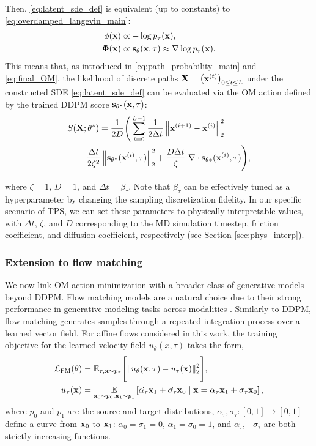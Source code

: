 Then, \eqref{eq:latent_sde_def} is equivalent (up to constants) to \eqref{eq:overdamped_langevin_main}:
\begin{align}
    \phi(\mathbf{x}) &\propto - \log p_\tau(\mathbf{x}), \\
    \mathbf{\Phi}(\mathbf{x}) &\propto \mathbf{s}_\theta(\mathbf{x}, \tau) \approx \nabla \log p_\tau(\mathbf{x}).
\end{align}
This means that, as introduced in \eqref{eq:path_probability_main} and \eqref{eq:final_OM}, the likelihood of discrete paths $\mathbf{X} = \left(\mathbf{x}^{(t)} \right)_{0 \leq t \leq L}$ under the constructed SDE \eqref{eq:latent_sde_def} can be evaluated via the OM action defined by the trained DDPM score $\mathbf{s}_{\theta^*}(\mathbf{x}, \tau)$:
\begin{align}
\begin{split}
    &S(\mathbf{X}; \theta^*) = \frac{1}{2D}\Bigg(\sum_{i=0}^{L-1}  \frac{1}{ 2\Delta t}\left\|\mathbf{x}^{(i+1)} - \mathbf{x}^{(i)} \right\|^2_2 \\
    &\quad 
    + \frac{\Delta t}{2\zeta^2} \left\|\mathbf{s}_{\theta^*}(\mathbf{x}^{(i)}, \tau)\right\|_2^2 + \frac{D \Delta t}{\zeta} \ \nabla \cdot \mathbf{s}_{\theta*}(\mathbf{x}^{(i)}, \tau)\Bigg),
\end{split}
\label{eq:generative_om_action}
\end{align}

where $\zeta = 1$, $D=1$, and $\Delta t = \beta_\tau$. Note that $\beta_\tau$ can be effectively tuned as a hyperparameter by changing the sampling discretization fidelity. In our specific scenario of TPS, we can set these parameters to physically interpretable values, with $\Delta t$, $\zeta$, and $D$ corresponding to the MD simulation timestep, friction coefficient, and diffusion coefficient, respectively (see Section \ref{sec:phys_interp}).

\subsubsection{Extension to flow matching}
We now link OM action-minimization with a broader class of generative models beyond DDPM. Flow matching models \cite{lipman2022flow} are a natural choice due to their strong performance in generative modeling tasks across modalities \cite{jing2024alphafoldmeetsflowmatching, polyak2024movie}. Similarly to DDPM, flow matching generates samples through a repeated integration process over a learned vector field. For affine flows considered in this work, the training objective for the learned velocity field $u_\theta(x, \tau)$ takes the form,
\begin{align}
    \mathcal{L}_\text{FM}(\theta) &= \mathbb{E}_{\tau, \xx \sim p_\tau} \Bigg[ \|u_\theta(\xx, \tau) - u_\tau(\xx)\|_2^2 \Bigg],\\
    u_\tau(\xx) &= \E_{\xx_0 \sim p_0, \xx_1 \sim p_1}\left[ \dot{\alpha_\tau} \xx_1 + \dot{\sigma_\tau} \xx_0 \mid \xx = \alpha_\tau \xx_1 + \sigma_\tau \xx_0\right],
\end{align}
where $p_0$ and $p_1$ are the source and target distributions, $\alpha_\tau, \sigma_\tau : [0,1] \to [0,1]$ define a curve from $\mathbf{x}_0$ to $\mathbf{x}_1$: $\alpha_0 = \sigma_1 = 0$, $\alpha_1 = \sigma_0 = 1$, and $\alpha_\tau, -\sigma_\tau$ are both strictly increasing functions.

